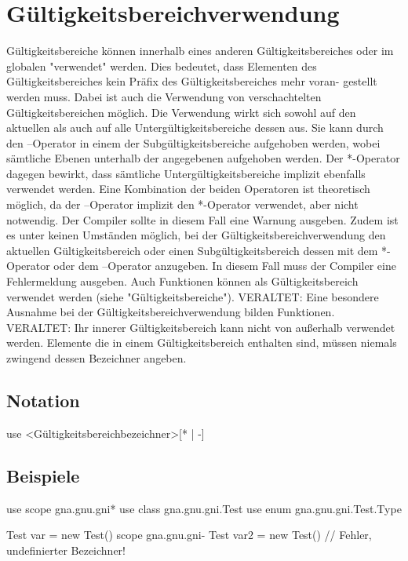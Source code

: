 \chapter{Gültigkeitsbereichverwendung}
Gültigkeitsbereiche können innerhalb eines anderen Gültigkeitsbereiches oder im globalen "verwendet" werden.
Dies bedeutet, dass Elementen des Gültigkeitsbereiches kein Präfix des Gültigkeitsbereiches mehr voran-
gestellt werden muss.
Dabei ist auch die Verwendung von verschachtelten Gültigkeitsbereichen möglich.
Die Verwendung wirkt sich sowohl auf den aktuellen als auch auf alle Untergültigkeitsbereiche dessen aus.
Sie kann durch den --Operator in einem der Subgültigkeitsbereiche aufgehoben werden, wobei sämtliche Ebenen unterhalb der angegebenen
aufgehoben werden.
Der *-Operator dagegen bewirkt, dass sämtliche Untergültigkeitsbereiche implizit ebenfalls verwendet werden.
Eine Kombination der beiden Operatoren ist theoretisch möglich, da der --Operator implizit den *-Operator verwendet, aber nicht notwendig.
Der Compiler sollte in diesem Fall eine Warnung ausgeben.
Zudem ist es unter keinen Umständen möglich, bei der Gültigkeitsbereichverwendung den aktuellen Gültigkeitsbereich oder einen Subgültigkeitsbereich
dessen mit dem *-Operator oder dem --Operator anzugeben.
In diesem Fall muss der Compiler eine Fehlermeldung ausgeben.
Auch Funktionen können als Gültigkeitsbereich verwendet werden (siehe "Gültigkeitsbereiche").
VERALTET: Eine besondere Ausnahme bei der Gültigkeitsbereichverwendung bilden Funktionen.
VERALTET: Ihr innerer Gültigkeitsbereich kann nicht von außerhalb verwendet werden.
Elemente die in einem Gültigkeitsbereich enthalten sind, müssen niemals zwingend dessen Bezeichner angeben.

\section{Notation}
use <Gültigkeitsbereichbezeichner>[* | -]

\section{Beispiele}
use scope gna.gnu.gni*
use class gna.gnu.gni.Test
use enum gna.gnu.gni.Test.Type

Test var = new Test()
scope gna.gnu.gni-
Test var2 = new Test() // Fehler, undefinierter Bezeichner!